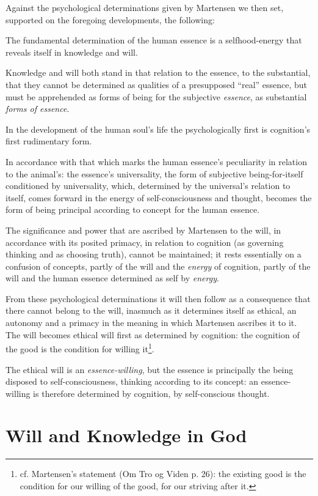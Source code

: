 \documentclass[12pt,a4paper]{book}
\begin{document}
Against the psychological determinations given by Martensen we then set, supported
on the foregoing developments, the following:

The fundamental determination of the human essence is a selfhood-energy that
reveals itself in knowledge and will.

Knowledge and will both stand in that relation to the essence, to the substantial,
that they cannot be determined as qualities of a presupposed ``real'' essence, but
must be apprehended as forms of being for the subjective \emph{essence}, as substantial
\emph{forms of essence}.

In the development of the human soul's life the psychologically first is
cognition's first rudimentary form.

In accordance with that which marks the human essence's peculiarity in relation to
the animal's: the essence's universality, the form of subjective being-for-itself
conditioned by universality, which, determined by the universal's relation to itself,
comes forward in the energy of self-consciousness and thought, becomes the form of
being principal according to concept for the human essence.

The significance and power that are ascribed by Martensen to the will, in
accordance with its posited primacy, in relation to cognition (as governing
thinking and as choosing truth), cannot be maintained; it rests essentially on a
confusion of concepts, partly of the will and the \emph{energy} of cognition, partly of
the will and the human essence determined as self by \emph{energy}.

From these psychological determinations it will then follow as a consequence that
there cannot belong to the will, inasmuch as it determines itself as ethical, an
autonomy and a primacy in the meaning in which Martensen ascribes it to it. The
will becomes ethical will first as determined by cognition: the cognition of the
good is the condition for willing it\footnote{cf. Martensen's statement (Om Tro og
Viden p. 26): the existing good is the condition for our willing of the good, for
our striving after it.}.

The ethical will is an \emph{essence-willing}, but the essence is principally the being
disposed to self-consciousness, thinking according to its concept: an
essence-willing is therefore determined by cognition, by self-conscious thought.

\section{Will and Knowledge in God}
\label{sec:will-god}
\end{document}
